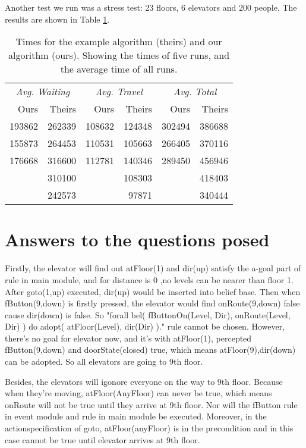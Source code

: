 \documentclass[a4paper,10pt,twocolumn]{article}
\begin{document}
Another test we run was a stress test: 23 floors, 6 elevators and 200 people. The results are shown in Table \ref{tbl:6car_23lev_200pop_results}.
\begin{table}[ht]
 \begin{tabular}{rr|rr|rr}
  \hline
  \multicolumn{2}{c|}{\emph{Avg. Waiting}} & \multicolumn{2}{c|}{\emph{Avg. Travel}} & \multicolumn{2}{c}{\emph{Avg. Total}}\\
  Ours		& Theirs	& Ours 		& Theirs & Ours & Theirs \\
  \hline
   193862 & 262339 & 108632 & 124348 & 302494 & 386688\\
   155873 & 264453 & 110531 & 105663 & 266405 & 370116\\
   176668 & 316600 & 112781 & 140346 & 289450 & 456946\\
      & 310100 &	& 108303 &	& 418403\\
      & 242573 &	& 97871  &	& 340444\\
      
  \hline
\hline
 \end{tabular}
 \caption{Times for the example algorithm (theirs) and our algorithm (ours). Showing the times of five runs, and the average time of all runs.}
 \label{tbl:6car_23lev_200pop_results}
\end{table}


\section{Answers to the questions posed}
Firstly, the elevator will find out atFloor(1) and dir(up) satisfy the a-goal part of rule in main module, and for distance is 0 ,no levels can be nearer than floor 1. After goto(1,up) executed, dir(up) would be inserted into belief base. Then when fButton(9,down) is firstly pressed, the elevator would find onRoute(9,down) false cause dir(down) is false. So "forall bel( fButtonOn(Level, Dir), onRoute(Level, Dir) ) do adopt( atFloor(Level), dir(Dir) )." rule cannot be chosen. However, there's no goal for elevator now, and it's with atFloor(1), percepted fButton(9,down) and doorState(closed) true, which means atFloor(9),dir(down) can be adopted. So all elevators are going to 9th floor.

Besides, the elevators will igonore everyone on the way to 9th floor. Because when they're moving, atFloor(AnyFloor) can never be true, which means onRoute will not be true until they arrive at 9th floor. Nor will the fButton rule in event module and rule in main module be executed. Moreover, in the actionspecification of goto, atFloor(anyFloor) is in the precondition and in this case cannot be true until elevator arrives at 9th floor.
\end{document}
